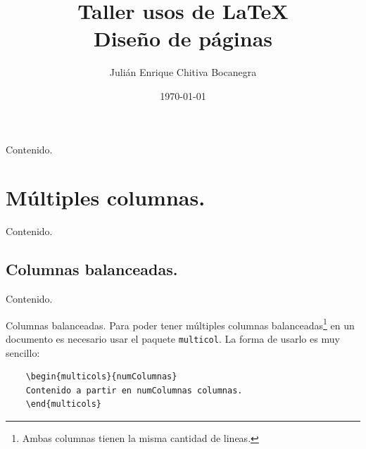 \documentclass[dvipsnames,xcolor, handout]{beamer}
\title{Taller usos de \LaTeX \\ \small{Diseño de páginas} \vspace*{-0.2cm}}
\author[Julián Chitiva Bocanegra]{Julián Enrique Chitiva Bocanegra}
\institute[Uniandes] 
{Universidad de los Andes\\ Facultad de Economía}
\date{\today}
\theoremstyle{plain}
\theoremstyle{definition}
\begin{document}
\begin{frame}
  \titlepage
\end{frame}

\begin{frame}{Contenido.}
\begin{footnotesize}
\vspace*{-1cm}
\begin{multicols}{2}
  \tableofcontents
\end{multicols}
\end{footnotesize}
\end{frame}

\section{Múltiples columnas.}
\begin{frame}{Contenido.}
\begin{footnotesize}
\vspace*{-1cm}
\begin{multicols}{2}
  \tableofcontents[currentsection]
\end{multicols}
\end{footnotesize}
\end{frame}

\subsection{Columnas balanceadas.}
\begin{frame}{Contenido.}
 \begin{footnotesize}
\vspace*{-1cm}
\begin{multicols}{2}
  \tableofcontents[currentsubsection]
\end{multicols}
\end{footnotesize}
\end{frame}

\begin{frame}[fragile]{Columnas balanceadas.}
Para poder tener múltiples columnas balanceadas\footnote{Ambas columnas tienen la misma cantidad de lineas.} en un documento es necesario usar el paquete \verb!multicol!. La forma de usarlo es muy sencillo:
\begin{verbatim}
    \begin{multicols}{numColumnas}
    Contenido a partir en numColumnas columnas.
    \end{multicols}
\end{verbatim}
\end{frame}
\end{document}
